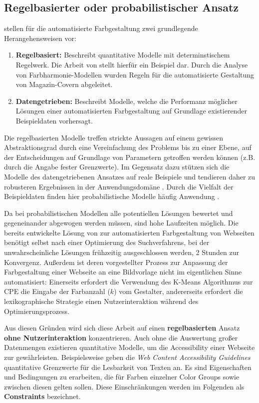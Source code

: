 \documentclass[11pt, bibliography=totoc]{scrartcl}
\begin{document}
\subsection{Regelbasierter oder probabilistischer Ansatz}

\citet{webpage} stellen für die automatisierte Farbgestaltung zwei grundlegende Herangehensweisen vor:

\begin{enumerate}
	\item \textbf{Regelbasiert:} Beschreibt quantitative Modelle mit determinstischem Regelwerk. Die Arbeit von \citet{magazines} stellt hierfür ein Beispiel dar. Durch die Analyse von Farbharmonie-Modellen wurden Regeln für die automatisierte Gestaltung von Magazin-Covern abgeleitet.
	\item \textbf{Datengetrieben:} Beschreibt Modelle, welche die Performanz möglicher Lösungen einer automatisierten Farbgestaltung auf Grundlage existierender Beispieldaten vorhersagt.
\end{enumerate}

Die regelbasierten Modelle treffen strickte Aussagen auf einem gewissen Abstraktionsgrad durch eine Vereinfachung des Problems bis zu einer Ebene, auf der Entscheidungen auf Grundlage von Parametern getroffen werden können (z.B. durch die Angabe fester Grenzwerte). Im Gegensatz dazu stützen sich die Modelle des datengetriebenen Ansatzes auf reale Beispiele und tendieren daher zu robusteren Ergebnissen in der Anwendungsdomäne \citep{webpage}. Durch die Vielfalt der Beispieldaten finden hier probabilistische Modelle häufig Anwendung \citep[siehe z.B.][]{webpage, patterns}.

Da bei probabilistischen Modellen alle potentiellen Lösungen bewertet und gegeneinander abgewogen werden müssen, sind hohe Laufzeiten möglich. Die bereits entwickelte Lösung von \citet{webpage} zur automatisierten Farbgestaltung von Webseiten benötigt selbst nach einer Optimierung des Suchverfahrens, bei der unwahrscheinliche Lösungen frühzeitig ausgeschlossen werden, 2 Stunden zur Konvergenz. Außerdem ist deren vorgestellter Prozess zur Anpassung der Farbgestaltung einer Webseite an eine Bildvorlage nicht im eigentlichen Sinne automatisiert: Einerseits erfordert die Verwendung des K-Means Algorithmus zur CPE die Eingabe der Farbanzahl ($k$) vom Gestalter, andererseits erfordert die lexikographische Strategie einen Nutzerinteraktion während des Optimierungsprozess.

Aus diesen Gründen wird sich diese Arbeit auf einen \textbf{regelbasierten} Ansatz \textbf{ohne Nutzerinteraktion} konzentrieren. Auch ohne die Auswertung großer Datenmengen existieren quantitative Modelle, um die Accessibility einer Webseite zur gewährleisten. Beispielsweise geben die \emph{Web Content Accessibility Guidelines} \citep{wcag} quantitative Grenzwerte für die Lesbarkeit von Texten an. Es sind Eigenschaften und Bedingungen zu erarbeiten, die für Farben einzelner Color Groups sowie zwischen diesen gelten sollen. Diese Einschränkungen werden im Folgenden als \textbf{Constraints} bezeichnet.
\end{document}
